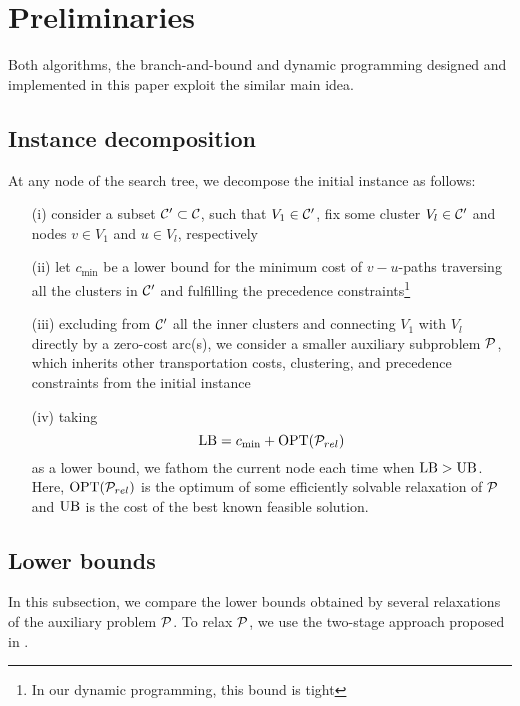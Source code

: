 \section{Preliminaries}\label{sec:pre}
Both algorithms, the branch-and-bound and dynamic programming designed and implemented in this paper exploit the similar main idea. 

\subsection{Instance decomposition}
At any node of the search tree, we decompose the initial instance as follows: 
\begin{itemize}
	\item[(i)] consider a subset $\C'\subset\C$, such that $V_1\in\C'$, fix some cluster $V_l\in\C'$ and nodes $v\in V_1$ and $u\in V_l$, respectively
	\item[(ii)] let $c_{\min}$ be a lower bound for the minimum cost of $v-u$-paths traversing all the clusters in $\C'$ and fulfilling the precedence constraints\footnote{In our dynamic programming, this bound is tight} 
	\item[(iii)] excluding from $\C'$ all the inner clusters and connecting $V_1$ with $V_l$ directly by a zero-cost arc(s), we consider a smaller auxiliary subproblem $\P$, which inherits other transportation costs, clustering, and precedence constraints from the initial instance 
	\item[(iv)] taking 
	\begin{equation}\label{e:bounds}
		\LB = c_{\min} + \OPT{\P_{rel}}
	\end{equation}
	as a lower bound, we fathom the current node each time when $\LB > \UB$. Here, $\OPT{\P_{rel}}$ is the optimum of some efficiently solvable relaxation of $\P$ and $\UB$ is the cost of the best known feasible solution.
\end{itemize}
\subsection{Lower bounds}\label{ssec:LBs}
In this subsection, we compare the lower bounds obtained by several relaxations of the auxiliary problem $\P$. To relax $\P$, we use the two-stage approach proposed in \cite{SALMAN2020163}. 

